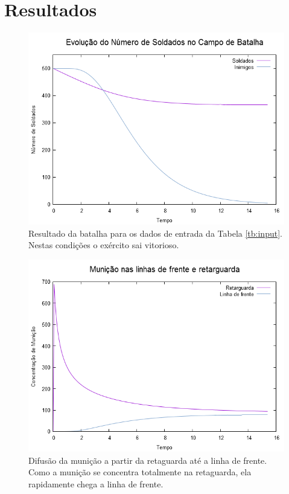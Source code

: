 \documentclass{article}
\begin{document}
\section{Resultados}

\begin{figure}[ht]
	\centering
	\includegraphics[scale=0.35]{figs/battle_reaction.png}
	\caption{Resultado da batalha para os dados de entrada da Tabela \ref{tb:input}. Nestas condições o exército sai vitorioso.}
	\label{fig:battle1}
\end{figure}

\begin{figure}[ht]
	\centering
	\includegraphics[scale=0.35]{figs/battle_ammo_diffusion.png}
	\caption{Difusão da munição a partir da retaguarda até a linha de frente. Como a munição se concentra totalmente na retaguarda, ela rapidamente chega a linha de frente.}
	\label{fig:battle1-ammo}
\end{figure}
\end{document}
